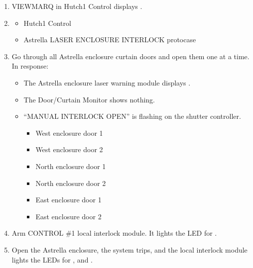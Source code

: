 \documentclass[letterpaper,10pt,english]{sphinxmanual}
\begin{document}
\begin{enumerate}
\item {} 
\sphinxAtStartPar
VIEWMARQ in Hutch\sphinxhyphen{}1 Control displays .

\item {} \begin{description}
\begin{itemize}
\item {} 
\sphinxAtStartPar
Hutch\sphinxhyphen{}1 Control

\item {} 
\sphinxAtStartPar
Astrella LASER ENCLOSURE INTERLOCK protocase

\end{itemize}

\end{description}

\item {} 
\sphinxAtStartPar
Go through all Astrella enclosure curtain doors and open them one at a time.
In response:
\begin{itemize}
\item {} 
\sphinxAtStartPar
The Astrella enclosure laser warning module displays .

\item {} 
\sphinxAtStartPar
The Door/Curtain Monitor shows nothing.

\item {} 
\sphinxAtStartPar
“MANUAL INTERLOCK OPEN” is flashing on the shutter controller.
\begin{itemize}
\item {} 
\sphinxAtStartPar
West enclosure door 1

\item {} 
\sphinxAtStartPar
West enclosure door 2

\item {} 
\sphinxAtStartPar
North enclosure door 1

\item {} 
\sphinxAtStartPar
North enclosure door 2

\item {} 
\sphinxAtStartPar
East enclosure door 1

\item {} 
\sphinxAtStartPar
East enclosure door 2

\end{itemize}

\end{itemize}

\item {} 
\sphinxAtStartPar
Arm CONTROL \#1 local interlock module.
It lights the LED for .

\item {} 
\sphinxAtStartPar
Open the Astrella enclosure, the system trips, and the local interlock module lights the LEDs for , and .

\end{enumerate}
\end{document}
